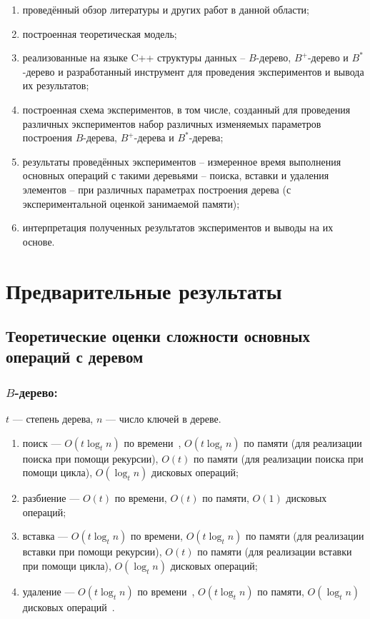 \documentclass{llncs}
\begin{document}
	\begin{enumerate}
		\item проведённый обзор литературы и других работ в данной области;
		\item построенная теоретическая модель;
		\item реализованные на языке C++ структуры данных – $B$-дерево, $B^+$-дерево и $B^*$-дерево и разработанный инструмент для проведения экспериментов и вывода их результатов;
		\item построенная схема экспериментов, в том числе, созданный для проведения различных экспериментов набор различных изменяемых параметров построения $B$-дерева, $B^+$-дерева и $B^*$-дерева;
		\item результаты проведённых экспериментов – измеренное время выполнения основных операций с такими деревьями – поиска, вставки и удаления элементов – при различных параметрах построения дерева (с экспериментальной оценкой занимаемой памяти);
		\item интерпретация полученных результатов экспериментов и выводы на их основе.
	\end{enumerate}
	
	\section{Предварительные результаты}
	
	\subsection{Теоретические оценки сложности основных операций с деревом}
	
	\subsubsection{$B$-дерево:}
	
	$t$ --- степень дерева, $n$ --- число ключей в дереве.
	
	\begin{enumerate}
		\item поиск --- $O(t\log_t n)$ по времени~\cite{Kormen}, $O(t\log_t n)$ по памяти (для реализации поиска при помощи рекурсии), $O(t)$ по памяти (для реализации поиска при помощи цикла), $O(\log_t n)$ дисковых операций;
		\item разбиение --- $O(t)$ по времени, $O(t)$ по памяти, $O(1)$ дисковых операций;
		\item вставка --- $O(t\log_t n)$ по времени, $O(t\log_t n)$ по памяти (для реализации вставки при помощи рекурсии), $O(t)$ по памяти (для реализации вставки при помощи цикла), $O(\log_t n)$ дисковых операций;
		\item удаление --- $O(t\log_t n)$ по времени~\cite{Kormen}, $O(t\log_t n)$ по памяти, $O(\log_t n)$ дисковых операций~\cite{Kormen}.
	\end{enumerate}
    
\end{document}
